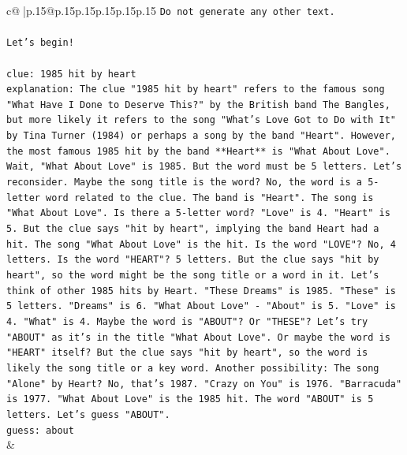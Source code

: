 \documentclass{article}
\begin{document}
{\begin{supertabular}{c@{$\;$}|p{.15\linewidth}@{}p{.15\linewidth}p{.15\linewidth}p{.15\linewidth}p{.15\linewidth}p{.15\linewidth}}
{{{\texttt{Do not generate any other text.} \\
\\ 
\texttt{Let's begin!} \\
\\ 
\texttt{clue: 1985 hit by heart} \\
\texttt{explanation: The clue "1985 hit by heart" refers to the famous song "What Have I Done to Deserve This?" by the British band The Bangles, but more likely it refers to the song "What's Love Got to Do with It" by Tina Turner (1984) or perhaps a song by the band "Heart". However, the most famous 1985 hit by the band **Heart** is "What About Love". Wait, "What About Love" is 1985. But the word must be 5 letters. Let's reconsider. Maybe the song title is the word? No, the word is a 5{-}letter word related to the clue. The band is "Heart". The song is "What About Love". Is there a 5{-}letter word? "Love" is 4. "Heart" is 5. But the clue says "hit by heart", implying the band Heart had a hit. The song "What About Love" is the hit. Is the word "LOVE"? No, 4 letters. Is the word "HEART"? 5 letters. But the clue says "hit by heart", so the word might be the song title or a word in it. Let's think of other 1985 hits by Heart. "These Dreams" is 1985. "These" is 5 letters. "Dreams" is 6. "What About Love" {-} "About" is 5. "Love" is 4. "What" is 4. Maybe the word is "ABOUT"? Or "THESE"? Let's try "ABOUT" as it's in the title "What About Love". Or maybe the word is "HEART" itself? But the clue says "hit by heart", so the word is likely the song title or a key word. Another possibility: The song "Alone" by Heart? No, that's 1987. "Crazy on You" is 1976. "Barracuda" is 1977. "What About Love" is the 1985 hit. The word "ABOUT" is 5 letters. Let's guess "ABOUT".} \\
\texttt{guess: about} \\
            }
        }
    }
    & \\ \\


\end{supertabular}}
\end{document}
